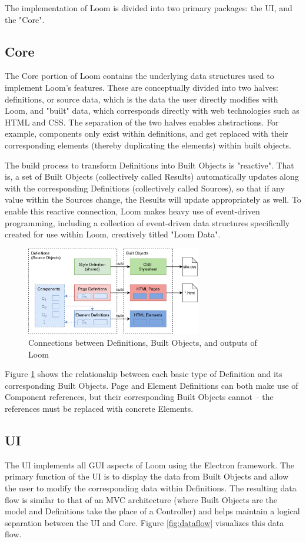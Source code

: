 \documentclass[conference, letterpaper]{IEEEtran}
\begin{document}
The implementation of Loom is divided into two primary packages: the UI, and the "Core".

\subsection{Core}
The Core portion of Loom contains the underlying data structures used to implement Loom's features. These are conceptually divided into two halves: definitions, or source data, which is the data the user directly modifies with Loom, and "built" data, which corresponds directly with web technologies such as HTML and CSS. The separation of the two halves enables abstractions. For example, components only exist within definitions, and get replaced with their corresponding elements (thereby duplicating the elements) within built objects.

The build process to transform Definitions into Built Objects is "reactive". That is, a set of Built Objects (collectively called Results) automatically updates along with the corresponding Definitions (collectively called Sources), so that if any value within the Sources change, the Results will update appropriately as well. To enable this reactive connection, Loom makes heavy use of event-driven programming, including a collection of event-driven data structures specifically created for use within Loom, creatively titled "Loom Data".

\begin{figure}[!t]
  \centering
  \includegraphics[width=3in]{../core.png}
  \caption{Connections between Definitions, Built Objects, and outputs of Loom}
  \label{fig:core}
\end{figure}

Figure \ref{fig:core} shows the relationship between each basic type of Definition and its corresponding Built Objects. Page and Element Definitions can both make use of Component references, but their corresponding Built Objects cannot -- the references must be replaced with concrete Elements.

\subsection{UI}
The UI implements all GUI aspects of Loom using the Electron framework. The primary function of the UI is to display the data from Built Objects and allow the user to modify the corresponding data within Definitions. The resulting data flow is similar to that of an MVC architecture (where Built Objects are the model and Definitions take the place of a Controller) and helps maintain a logical separation between the UI and Core. Figure \ref{fig:dataflow} visualizes this data flow.
\end{document}
